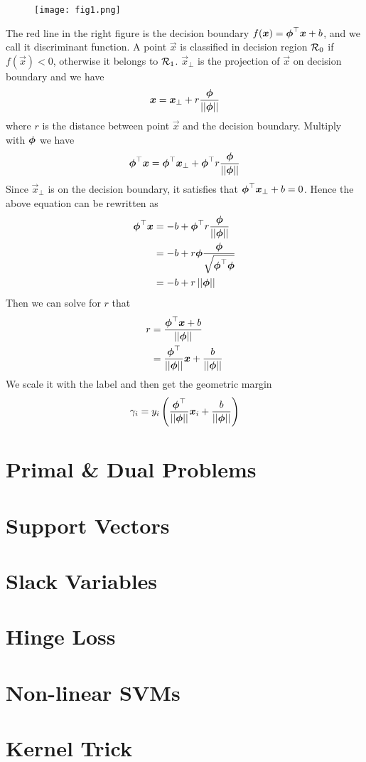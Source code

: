 \begin{wrapfigure}{r}{0.4\textwidth}
	\texttt{[image: fig1.png]}
\end{wrapfigure}
The red line in the right figure is the decision boundary $f(\boldsymbol{x})=\boldsymbol{\phi}^\top\boldsymbol{x}+b$, and we call it discriminant function. A point $\vec{x}$ is classified in decision region $\mathcal{R}_0$ if $f(\vec{x})<0$, otherwise it belongs to $\mathcal{R}_1$. $\vec{x}_\bot$ is the projection of $\vec{x}$ on decision boundary and we have
\begin{align*}
	\boldsymbol{x}=\boldsymbol{x}_\bot+r\frac{\boldsymbol{\phi}}{\left\vert\left\vert \boldsymbol{\phi} \right\vert\right\vert}
\end{align*}
where $r$ is the distance between point $\vec{x}$ and the decision boundary. Multiply with $\boldsymbol{\phi}$ we have
\begin{align*}
	\boldsymbol{\phi}^\top\boldsymbol{x}=\boldsymbol{\phi}^\top\boldsymbol{x}_\bot+\boldsymbol{\phi}^\top r\frac{\boldsymbol{\phi}}{\left\vert\left\vert \boldsymbol{\phi} \right\vert\right\vert}
\end{align*}
Since $\vec{x}_\bot$ is on the decision boundary, it satisfies that $\boldsymbol{\phi}^\top\boldsymbol{x}_\bot+b=0$. Hence the above equation can be rewritten as
\begin{align*}
	\boldsymbol{\phi}^\top\boldsymbol{x}&=-b+\boldsymbol{\phi}^\top r\frac{\boldsymbol{\phi}}{\left\vert\left\vert \boldsymbol{\phi} \right\vert\right\vert} \\
	&=-b+r\boldsymbol{\phi}\frac{\boldsymbol{\phi}}{\sqrt{\boldsymbol{\phi}^\top\boldsymbol{\phi}}} \\
	&=-b+r\left\vert\left\vert \boldsymbol{\phi} \right\vert\right\vert
\end{align*}
Then we can solve for $r$ that
\begin{align*}
	r&=\frac{\boldsymbol{\phi}^\top\boldsymbol{x}+b}{\left\vert\left\vert \boldsymbol{\phi} \right\vert\right\vert} \\
	&=\frac{\boldsymbol{\phi}^\top}{\left\vert\left\vert \boldsymbol{\phi} \right\vert\right\vert}\boldsymbol{x}+\frac{b}{\left\vert\left\vert \boldsymbol{\phi} \right\vert\right\vert}
\end{align*}
We scale it with the label and then get the geometric margin
\begin{align*}
	\gamma_i=y_i\left(\frac{\boldsymbol{\phi}^\top}{\left\vert\left\vert \boldsymbol{\phi} \right\vert\right\vert}\boldsymbol{x}_i+\frac{b}{\left\vert\left\vert \boldsymbol{\phi} \right\vert\right\vert}\right)
\end{align*}

\section{Primal \& Dual Problems}

\section{Support Vectors}

\section{Slack Variables}

\section{Hinge Loss}

\section{Non-linear SVMs}

\section{Kernel Trick}